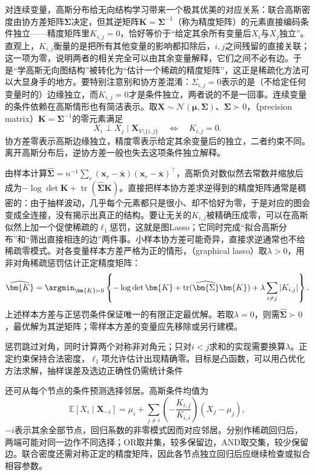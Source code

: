 对连续变量，高斯分布给无向结构学习带来一个极其优美的对应关系：联合高斯密度由协方差矩阵$\bm\Sigma$决定，但其逆矩阵$\bm K=\bm\Sigma^{-1}$（称为精度矩阵）的元素直接编码条件独立——精度矩阵里$K_{i,j}=0$，恰好等价于“给定其余所有变量后$X_i$与$X_j$独立”。直观上，$K_{i,j}$衡量的是把所有其他变量的影响都扣除后，$i,j$之间残留的直接关联；这一项为零，说明两者的相关完全可以由其余变量解释，它们之间不必有边。于是“学高斯无向图结构”被转化为“估计一个稀疏的精度矩阵”，这正是稀疏化方法可以大显身手的地方。要特别注意别和协方差混淆：$\Sigma_{i,j}=0$表示的是（不给定任何变量时的）边缘独立，而$K_{i,j}=0$才是条件独立，两者说的不是一回事。连续变量的条件依赖在高斯情形也有简洁表示。取$\bm{X}\sim\mathcal{N}(\bm{\mu},\bm{\Sigma})$、$\bm{\Sigma}\succ0$，（precision matrix）$\bm{K}=\bm{\Sigma}^{-1}$的零元素满足
\[
  X_i\perp X_j\mid\bm{X}_{V\setminus\{i,j\}}
  \quad\Longleftrightarrow\quad K_{i,j}=0.
\]
协方差零表示高斯边缘独立，精度零表示给定其余变量后的独立，二者约束不同。离开高斯分布后，逆协方差一般也失去这项条件独立解释。

由样本计算$\widehat{\bm{\Sigma}}=n^{-1}\sum_r(\bm{x}_r-\overline{\bm{x}})(\bm{x}_r-\overline{\bm{x}})^{\top}$，高斯负对数似然去常数并缩放后成为$-\log\det\bm{K}+\operatorname{tr}(\widehat{\bm{\Sigma}}\bm{K})$。直接把样本协方差求逆得到的精度矩阵通常是稠密的：由于抽样波动，几乎每个元素都只是很小、却不恰好为零，于是对应的图会变成全连接，没有揭示出真正的结构。要让无关的$K_{i,j}$被精确压成零，可以在高斯似然上加一个促使稀疏的$\ell_1$惩罚，这就是图Lasso；它同时完成“拟合高斯分布”和“筛出直接相连的边”两件事。小样本协方差可能奇异，直接求逆通常也不给稀疏零模式。对各变量样本方差严格为正的情形，（graphical lasso）取$\lambda>0$，用非对角稀疏惩罚估计正定精度矩阵：
\begin{equation}
  \widehat{\bm{K}}
  =\argmin_{\bm{K}\succ0}
    \left\{-\log\det\bm{K}
      +\operatorname{tr}(\widehat{\bm{\Sigma}}\bm{K})
      +\lambda\sum_{i\ne j}|K_{i,j}|\right\}.
  \label{eq:pgm-structure-learning-glasso}
\end{equation}
上述样本方差与正惩罚条件保证唯一的有限正定最优解。若取$\lambda=0$，则需$\widehat{\bm{\Sigma}}\succ0$，最优解为其逆矩阵；零样本方差的变量应先移除或另行建模。

惩罚跳过对角，同时计算两个对称非对角元；只对$i<j$求和的实现需要换算$\lambda$。正定约束保持合法密度，$\ell_1$项允许估计出现精确零。目标是凸函数，可以用凸优化方法求解，抽样误差及选边正确性仍需统计条件

还可从每个节点的条件预测选择邻居。高斯条件均值为
\[
  \mathbb{E}[X_i\mid\bm{X}_{-i}]
  =\mu_i+\sum_{j\ne i}
    \left(-\frac{K_{i,j}}{K_{i,i}}\right)(X_j-\mu_j),
\]
$-i$表示其余全部节点，回归系数的非零模式因而对应邻居。分别作稀疏回归后，两端可能对同一边作不同选择；OR取并集，较多保留边，AND取交集，较少保留边。联合密度还需对称正定的精度矩阵，因此各节点独立回归后应继续检查或拟合相容参数。

